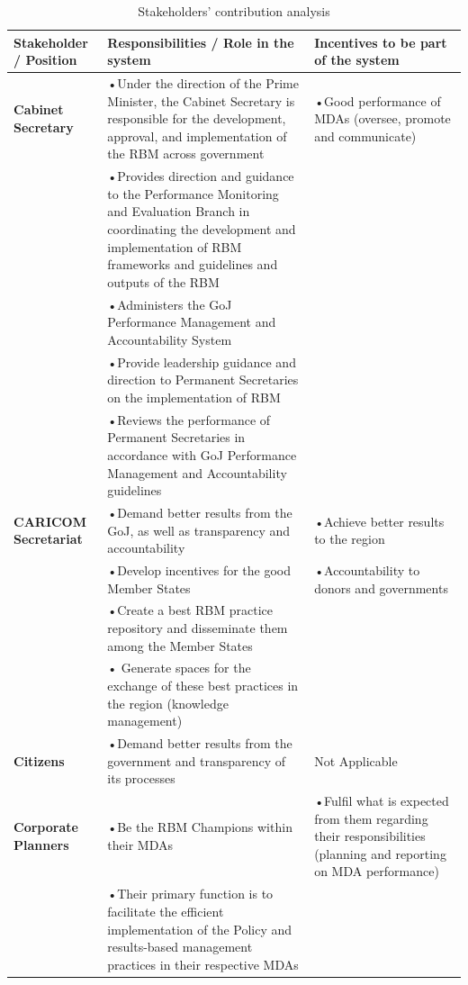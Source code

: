 \documentclass[
  10pt,
]{book}
\begin{document}
\begin{table}

\caption{\label{tab:unnamed-chunk-8}Stakeholders’ contribution analysis}
\centering
\fontsize{12}{14}\selectfont
\begin{tabu} to 
\hline
Stakeholder / Position & Responsibilities / Role in the system & Incentives to be part of the system\\
\hline
\textbf{Cabinet Secretary} & •Under the direction of the Prime Minister, the Cabinet Secretary is responsible for the development, approval, and implementation of the RBM across government & •Good performance of MDAs (oversee, promote and communicate)\\
\hline
\textbf{} & •Provides direction and guidance to the Performance Monitoring and Evaluation Branch in coordinating the development and implementation of RBM frameworks and guidelines and outputs of the RBM & \\
\hline
\textbf{} & •Administers the GoJ Performance Management and Accountability System & \\
\hline
\textbf{} & •Provide leadership guidance and direction to Permanent Secretaries on the implementation of RBM & \\
\hline
\textbf{} & •Reviews the performance of Permanent Secretaries in accordance with GoJ Performance Management and Accountability guidelines & \\
\hline
\textbf{CARICOM Secretariat} & •Demand better results from the GoJ, as well as transparency and accountability & •Achieve better results to the region\\
\hline
\textbf{} & •Develop incentives for the good Member States & •Accountability to donors and governments\\
\hline
\textbf{} & •Create a best RBM practice repository and disseminate them among the Member States & \\
\hline
\textbf{} & • Generate spaces for the exchange of these best practices in the region (knowledge management) & \\
\hline
\textbf{Citizens} & •Demand better results from the government and transparency of its processes & Not Applicable\\
\hline
\textbf{Corporate Planners} & •Be the RBM Champions within their MDAs & •Fulfil what is expected from them regarding their responsibilities (planning and reporting on MDA performance)\\
\hline
\textbf{} & •Their primary function is to facilitate the efficient implementation of the Policy and results-based management practices in their respective MDAs & \\

\end{tabu}
\end{table}
\end{document}
